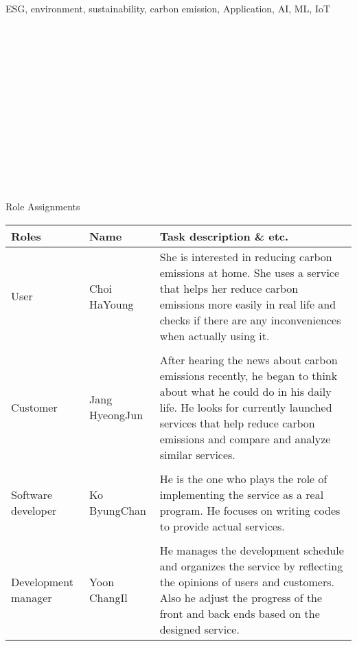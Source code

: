 \documentclass[11pt, conference]{IEEEtran}
\begin{document}
\begin{IEEEkeywords}
ESG, environment, sustainability, carbon emission, Application, AI, ML, IoT\\  \\ \\ \\ \\ \\ \\ \\ \\ \\ \\ \\ \\ \\
\end{IEEEkeywords}

\large{Role Assignments}
\begin{table}[H]
\center
\begin{tabular}{m{1.7cm} m{1.6cm} m{3.5cm}}
\toprule
Roles & Name & Task description \& etc.\\
\midrule
User & Choi HaYoung & She is interested in reducing carbon emissions at home. She uses a service that helps her reduce carbon emissions more easily in real life and checks if there are any inconveniences when actually using it. \\\\
Customer & Jang HyeongJun & After hearing the news about carbon emissions recently,   he began to think about what he could do in his daily life. He looks for   currently launched services that help reduce carbon emissions and compare and   analyze similar services. \\\\
Software developer & Ko ByungChan & He is the one who plays the role of implementing the service as a real program. He focuses on writing codes to provide actual services. \\\\
Development manager & Yoon ChangIl & He manages the development schedule and organizes the service by reflecting the opinions of users and customers. Also he adjust the progress of the front and back ends based on the designed service. \\
\bottomrule
\end{tabular}
\end{table}
\newpage
\end{document}
